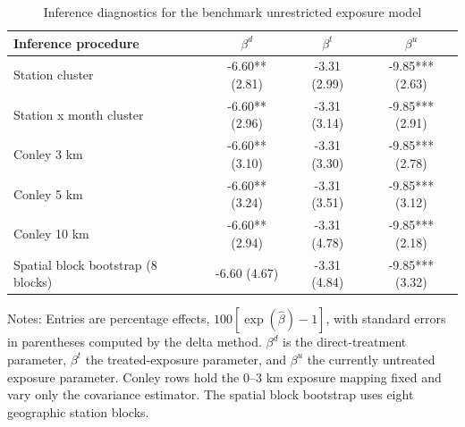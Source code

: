 \begin{table}[!htbp]
\centering
\begin{threeparttable}
\caption{Inference diagnostics for the benchmark unrestricted exposure model}
\label{tab:ulez_spatial_inference}
\begin{tabular}{lccc}
\toprule
Inference procedure & $\beta^d$ & $\beta^t$ & $\beta^u$ \\
\midrule
Station cluster & -6.60** (2.81) & -3.31 (2.99) & -9.85*** (2.63) \\
Station x month cluster & -6.60** (2.96) & -3.31 (3.14) & -9.85*** (2.91) \\
Conley 3 km & -6.60** (3.10) & -3.31 (3.30) & -9.85*** (2.78) \\
Conley 5 km & -6.60** (3.24) & -3.31 (3.51) & -9.85*** (3.12) \\
Conley 10 km & -6.60** (2.94) & -3.31 (4.78) & -9.85*** (2.18) \\
Spatial block bootstrap (8 blocks) & -6.60 (4.67) & -3.31 (4.84) & -9.85*** (3.32) \\
\bottomrule
\end{tabular}
\begin{tablenotes}[flushleft]
\footnotesize
\item Notes: Entries are percentage effects, $100[\exp(\widehat\beta)-1]$, with standard errors in parentheses computed by the delta method. $\beta^d$ is the direct-treatment parameter, $\beta^t$ the treated-exposure parameter, and $\beta^u$ the currently untreated exposure parameter. Conley rows hold the 0--3 km exposure mapping fixed and vary only the covariance estimator. The spatial block bootstrap uses eight geographic station blocks.
\end{tablenotes}
\end{threeparttable}
\end{table}
